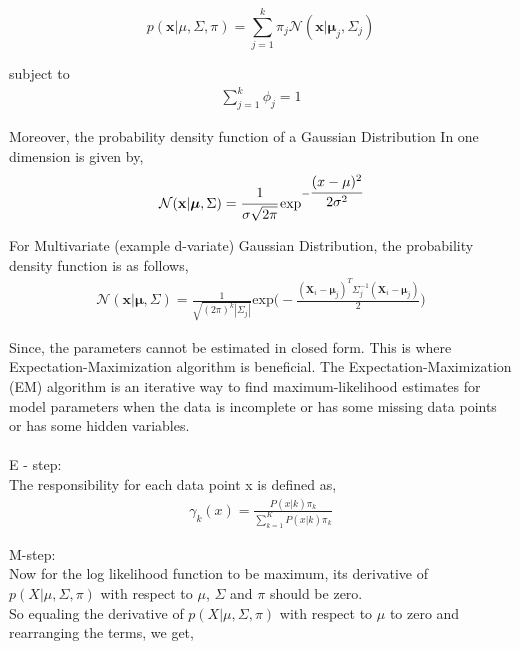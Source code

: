 \documentclass{article}
\begin{document}
\begin{itemize}

\begin{equation}
   p(\mathbf{x} | \mu, \Sigma, \pi) = \sum^k_{j=1} \pi_j {\mathcal{N}(\mathbf{x} | \boldsymbol{\mu}_j, \Sigma_j)} 
   \end{equation}
   
subject to
\begin{align}
\sum_{j=1}^k \phi_j = 1 
   \end{align}

Moreover, the probability density function of a Gaussian Distribution In one dimension  is given by, 
\begin{align}
\mathcal{N}(\mathbf{x} | \boldsymbol{\mu}, \Sigma) = \cfrac{1}{\sigma \sqrt{2\pi}}  \exp^{-\cfrac{(x-\mu)^2}{2\sigma^2}}
   \end{align}
   
 For Multivariate (example d-variate) Gaussian Distribution, the probability density function is as follows,
 \begin{align}
\mathcal{N}(\mathbf{x} | \boldsymbol{\mu}, \Sigma) = \frac{1}{\sqrt{(2\pi)^k |\Sigma_j|}} \text{exp}\Bigg( 
    - \frac{(\mathbf{X}_i - \boldsymbol{\mu}_j)^T \Sigma_j^{-1} (\mathbf{X}_i - \boldsymbol{\mu}_j) }
         {2} 
  \Bigg)
   \end{align} 

Since, the parameters cannot be estimated in closed form. This is where Expectation-Maximization algorithm is beneficial. The Expectation-Maximization (EM) algorithm is an iterative way to find maximum-likelihood estimates for model parameters when the data is incomplete or has some missing data points or has some hidden variables.  \\ \\

E - step: \\

The responsibility for each data point x is defined as, \\
\begin{align}
\gamma_{k}(x) =  \frac{ P(x|k) \pi_{k} }{ \sum_{k=1}^K P(x|k) \pi_{k} } 
\end{align}


M-step: \\
Now for the log likelihood function to be maximum, its derivative of $p(X|\mu, \Sigma, \pi)$ with respect to  $\mu$, $\Sigma$ and $\pi$ should be zero. \\

So equaling the derivative of  $p(X|\mu, \Sigma, \pi)$ with respect to $\mu$ to zero and rearranging the terms, we get, \\


\end{itemize}
\end{document}
